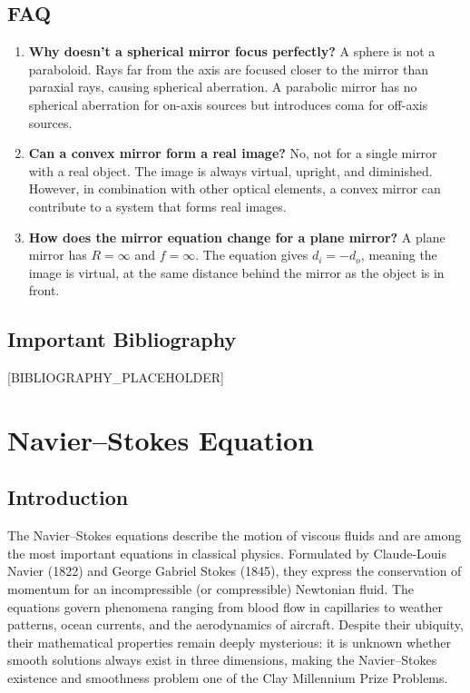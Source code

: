 \documentclass[11pt,openright]{book}
\begin{document}
\section*{FAQ}

\begin{enumerate}
\item \textbf{Why doesn't a spherical mirror focus perfectly?}
A sphere is not a paraboloid. Rays far from the axis are focused closer to the mirror than paraxial rays, causing spherical aberration. A parabolic mirror has no spherical aberration for on-axis sources but introduces coma for off-axis sources.

\item \textbf{Can a convex mirror form a real image?}
No, not for a single mirror with a real object. The image is always virtual, upright, and diminished. However, in combination with other optical elements, a convex mirror can contribute to a system that forms real images.

\item \textbf{How does the mirror equation change for a plane mirror?}
A plane mirror has $R = \infty$ and $f = \infty$. The equation gives $d_{i} = -d_{o}$, meaning the image is virtual, at the same distance behind the mirror as the object is in front.
\end{enumerate}
\section*{Important Bibliography}

[BIBLIOGRAPHY_PLACEHOLDER]


\chapter{Navier--Stokes Equation}

\section*{Introduction}

The Navier--Stokes equations describe the motion of viscous fluids and are among the most important equations in classical physics. Formulated by Claude-Louis Navier (1822) and George Gabriel Stokes (1845), they express the conservation of momentum for an incompressible (or compressible) Newtonian fluid. The equations govern phenomena ranging from blood flow in capillaries to weather patterns, ocean currents, and the aerodynamics of aircraft. Despite their ubiquity, their mathematical properties remain deeply mysterious: it is unknown whether smooth solutions always exist in three dimensions, making the Navier--Stokes existence and smoothness problem one of the Clay Millennium Prize Problems.
\end{document}
